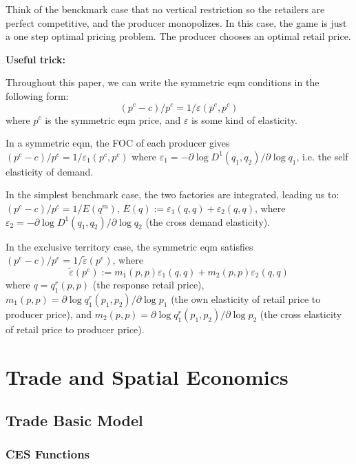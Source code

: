 \documentclass{book}
\theoremstyle{plain}
\theoremstyle{definition}
\begin{document}
Think of the benckmark case that no vertical restriction so the retailers are perfect competitive, and the producer monopolizes. In this case, the game is just a one step optimal pricing problem. The producer chooses an optimal retail price.\\

\begin{mdframed}[style=comment]

\noindent
\textbf{Useful trick:}

Throughout this paper, we can write the symmetric eqm conditions in the following form:
\[(p^c - c)/p^c=1/\varepsilon(p^c,p^c)\]
where $p^c$ is the symmetric eqm price, and $\varepsilon$ is some kind of elasticity.

In a symmetric eqm, the FOC of each producer gives 
\((p^c - c)/p^c=1/\varepsilon_1(p^c,p^c)\)
where $\varepsilon_1 = -\partial \log D^1(q_1,q_2)/\partial \log q_1$, i.e. the self elasticity of demand.

In the simplest benchmark case, the two factories are integrated, leading us to:
\((p^c - c)/p^c=1/E(q^m)\),
$E(q):=\varepsilon_1(q,q)+\varepsilon_2(q,q)$, where $\varepsilon_2 = -\partial \log D^1(q_1,q_2)/\partial \log q_2$ (the cross demand elasticity).

In the exclusive territory case, the symmetric eqm satisfies \((p^e - c)/p^e=1/\tilde\varepsilon(p^e)\), where 
\[\tilde\varepsilon(p^e):=m_1(p,p)\varepsilon_1(q,q)+m_2(p,p)\varepsilon_2(q,q) \]
where $q=q_1^r(p,p)$ (the response retail price),
$m_1(p,p)=\partial \log q_1^r(p_1,p_2)/\partial \log p_1$ (the own elasticity of retail price to producer price),
and  $m_2(p,p)=\partial \log q_1^r(p_1,p_2)/\partial \log p_2$ (the cross elasticity of retail price to producer price).

\end{mdframed}




\part{Trade and Spatial Economics} %
\label{prt:trade_ _and_ _spatial_ _economics_}

\chapter{Trade Basic Model} %
\label{cha:trade_basic_model}


\section{CES Functions} %
\label{sec:ces_functions}
\end{document}

